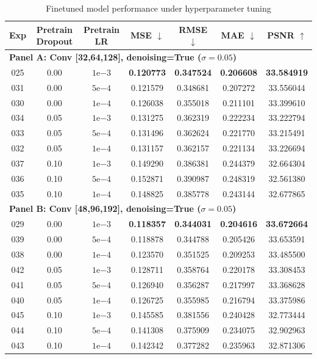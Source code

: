 \documentclass[10pt,letterpaper]{article}
\begin{document}
\begin{table}[t]
\centering
\caption{Finetuned model performance under hyperparameter tuning}
\label{tab:finetune_param_tuning}
\scriptsize
\setlength{\tabcolsep}{5pt}
\begin{tabular}{c c c c c c c}
\toprule
Exp & Pretrain Dropout & Pretrain LR & MSE $\downarrow$ & RMSE $\downarrow$ & MAE $\downarrow$ & PSNR $\uparrow$ \\
\midrule
\multicolumn{7}{l}{\textbf{Panel A: Conv [32,64,128], denoising=True ($\sigma=0.05$)}}\\
\midrule
025 & 0.00 & $1\mathrm{e}{-3}$ & \textbf{0.120773} & \textbf{0.347524} & \textbf{0.206608} & \textbf{33.584919} \\
031 & 0.00 & $5\mathrm{e}{-4}$ & 0.121579 & 0.348681 & 0.207272 & 33.556044 \\
030 & 0.00 & $1\mathrm{e}{-4}$ & 0.126038 & 0.355018 & 0.211101 & 33.399610 \\
034 & 0.05 & $1\mathrm{e}{-3}$ & 0.131275 & 0.362319 & 0.222234 & 33.222794 \\
033 & 0.05 & $5\mathrm{e}{-4}$ & 0.131496 & 0.362624 & 0.221770 & 33.215491 \\
032 & 0.05 & $1\mathrm{e}{-4}$ & 0.131157 & 0.362157 & 0.221134 & 33.226694 \\
037 & 0.10 & $1\mathrm{e}{-3}$ & 0.149290 & 0.386381 & 0.244379 & 32.664304 \\
036 & 0.10 & $5\mathrm{e}{-4}$ & 0.152871 & 0.390987 & 0.248319 & 32.561380 \\
035 & 0.10 & $1\mathrm{e}{-4}$ & 0.148825 & 0.385778 & 0.243144 & 32.677865 \\
\midrule
\multicolumn{7}{l}{\textbf{Panel B: Conv [48,96,192], denoising=True ($\sigma=0.05$)}}\\
\midrule
029 & 0.00 & $1\mathrm{e}{-3}$ & \textbf{0.118357} & \textbf{0.344031} & \textbf{0.204616} & \textbf{33.672664} \\
039 & 0.00 & $5\mathrm{e}{-4}$ & 0.118878 & 0.344788 & 0.205426 & 33.653591 \\
038 & 0.00 & $1\mathrm{e}{-4}$ & 0.123570 & 0.351525 & 0.209253 & 33.485500 \\
042 & 0.05 & $1\mathrm{e}{-3}$ & 0.128711 & 0.358764 & 0.220178 & 33.308453 \\
041 & 0.05 & $5\mathrm{e}{-4}$ & 0.126940 & 0.356287 & 0.217997 & 33.368628 \\
040 & 0.05 & $1\mathrm{e}{-4}$ & 0.126725 & 0.355985 & 0.216794 & 33.375986 \\
045 & 0.10 & $1\mathrm{e}{-3}$ & 0.145585 & 0.381556 & 0.240428 & 32.773444 \\
044 & 0.10 & $5\mathrm{e}{-4}$ & 0.141308 & 0.375909 & 0.234075 & 32.902963 \\
043 & 0.10 & $1\mathrm{e}{-4}$ & 0.142342 & 0.377282 & 0.235963 & 32.871306 \\
\bottomrule
\end{tabular}
\end{table}
\end{document}
